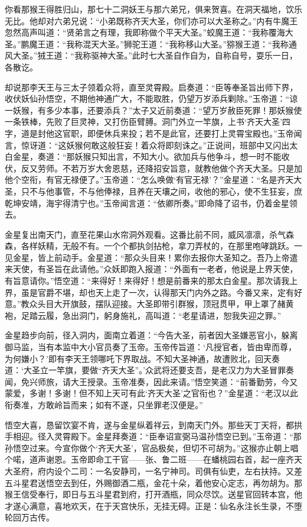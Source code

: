 \documentclass[12pt]{lsbook}
\begin{document}
你看那猴王得胜归山，那七十二洞妖王与那六弟兄，俱来贺喜。在洞天福地，饮乐无比。他却对六弟兄说：“小弟既称齐天大圣，你们亦可以大圣称之。”内有牛魔王忽然高声叫道：“贤弟言之有理，我即称做个平天大圣。”蛟魔王道：“我称覆海大圣。”鹏魔王道：“我称混天大圣。”狮驼王道：“我称移山大圣。”猕猴王道：“我称通风大圣。”\textQuanYu 狨王道：“我称驱神大圣。”此时七大圣自作自为，自称自号，耍乐一日，各散讫。

却说那李天王与三太子领着众将，直至灵霄殿。启奏道：“臣等奉圣旨出师下界，收伏妖仙孙悟空，不期他神通广大，不能取胜，仍望万岁添兵剿除。”玉帝道：“谅一妖猴，有多少本事，还要添兵？”太子又近前奏道：“望万岁赦臣死罪！那妖猴使一条铁棒，先败了巨灵神，又打伤臣臂膊。洞门外立一竿旗，上书‘齐天大圣’四字，道是封他这官职，即便休兵来投；若不是此官，还要打上灵霄宝殿也。”玉帝闻言，惊讶道：“这妖猴何敢这般狂妄！着众将即刻诛之。”正说间，班部中又闪出太白金星，奏道：“那妖猴只知出言，不知大小。欲加兵与他争斗，想一时不能收伏，反又劳师。不若万岁大舍恩慈，还降招安旨意，就教他做个齐天大圣。只是加他个空衔，有官无禄便了。”玉帝道：“怎么唤做‘有官无禄’？”金星道：“名是齐天大圣，只不与他事管，不与他俸禄，且养在天壤之间，收他的邪心，使不生狂妄，庶乾坤安靖，海宇得清宁也。”玉帝闻言道：“依卿所奏。”即命降了诏书，仍着金星领去。

金星复出南天门，直至花果山水帘洞外观看。这番比前不同，威风凛凛，杀气森森，各样妖精，无般不有。一个个都执剑拈枪，拿刀弄杖的，在那里咆哮跳跃。一见金星，皆上前动手。金星道：“那众头目来！累你去报你大圣知之。吾乃上帝遣来天使，有圣旨在此请他。”众妖即跑入报道：“外面有一老者，他说是上界天使，有旨意请你。”悟空道：“来得好！来得好！想是前番来的那太白金星。那次请我上界，虽是官爵不堪，却也天上走了一次，认得那天门内外之路。今番又来，定有好意。”教众头目大开旗鼓，摆队迎接。大圣即带引群猴，顶冠贯甲，甲上罩了赭黄袍，足踏云履，急出洞门，躬身施礼，高叫道：“老星请进，恕我失迎之罪。”

金星趋步向前，径入洞内，面南立着道：“今告大圣，前者因大圣嫌恶官小，躲离御马监，当有本监中大小官员奏了玉帝。玉帝传旨道：‘凡授官者，皆由卑而尊，为何嫌小？’即有李天王领哪吒下界取战。不知大圣神通，故遭败北，回天奏道：‘大圣立一竿旗，要做“齐天大圣”。’众武将还要支吾，是老汉力为大圣冒罪奏闻，免兴师旅，请大王授录。玉帝准奏，因此来请。”悟空笑道：“前番勤劳，今又蒙爱，多谢！多谢！但不知上天可有此‘齐天大圣’之官衔也？”金星道：“老汉以此衔奏准，方敢岭旨而来；如有不遂，只坐罪老汉便是。”

悟空大喜，恳留饮宴不肯，遂与金星纵着祥云，到南天门外。那些天丁天将，都拱手相迎。径入灵霄殿下。金星拜奏道：“臣奉诏宣弼马温孙悟空已到。”玉帝道：“那孙悟空过来。今宣你做个‘齐天大圣’，官品极矣，但切不可胡为。”这猴亦止朝上唱个喏，道声谢恩。玉帝即命工干官——张、鲁二班——在蟠桃园右首，起一座齐天大圣府，府内设个二司：一名安静司，一名宁神司。司俱有仙吏，左右扶持。又差五斗星君送悟空去到任，外赐御酒二瓶，金花十朵，着他安心定志，再勿胡为。那猴王信受奉行，即日与五斗星君到府，打开酒瓶，同众尽饮。送星官回转本宫，他才遂心满意，喜地欢天，在于天宫快乐，无挂无碍。正是：仙名永注长生录，不堕轮回万古传。
\end{document}
